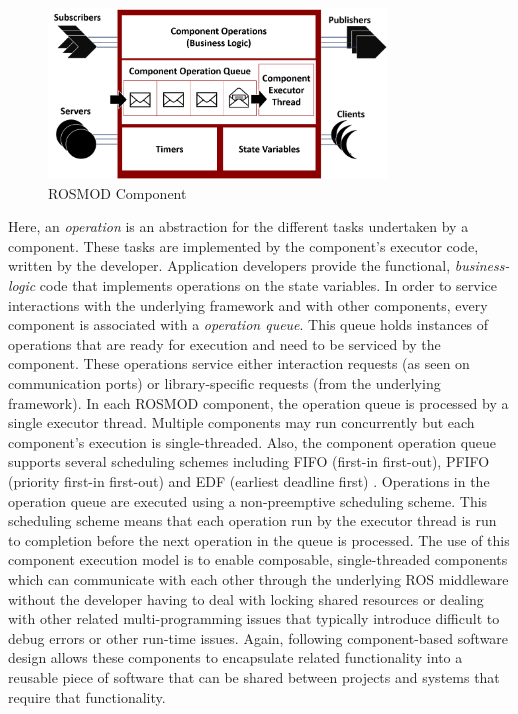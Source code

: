 \begin{figure}[h]
	\centering
        \includegraphics[width=0.8\textwidth]{Figures/ROSMOD_Component.png}
	\caption{ROSMOD Component}
	\label{fig:ROSMOD_Component}
\end{figure}

Here, an \emph{operation} is an abstraction for the different tasks
undertaken by a component. These tasks are implemented by the
component's executor code, written by the developer. Application
developers provide the functional, \emph{business-logic} code that
implements operations on the state variables. In order to service
interactions with the underlying framework and with other components,
every component is associated with a \emph{operation queue}. This
queue holds instances of operations that are ready for execution and
need to be serviced by the component. These operations service either
interaction requests (as seen on communication ports) or
library-specific requests (from the underlying framework). In each
ROSMOD component, the operation queue is processed by a single
executor thread. Multiple components may run concurrently but each
component's execution is single-threaded. Also, the component
operation queue supports several scheduling schemes including FIFO
(first-in first-out), PFIFO (priority first-in first-out) \cite{lehoczky1990fixed} and EDF
(earliest deadline first) \cite{liu1973scheduling}. Operations in the operation queue are executed using a non-preemptive scheduling scheme. This scheduling
scheme means that each operation run by the executor thread is run to
completion before the next operation in the queue is processed.  The
use of this component execution model is to enable composable,
single-threaded components which can communicate with each other
through the underlying ROS middleware without the developer having to
deal with locking shared resources or dealing with other related
multi-programming issues that typically introduce difficult to debug
errors or other run-time issues.  Again, following component-based
software design allows these components to encapsulate related
functionality into a reusable piece of software that can be shared
between projects and systems that require that functionality.


